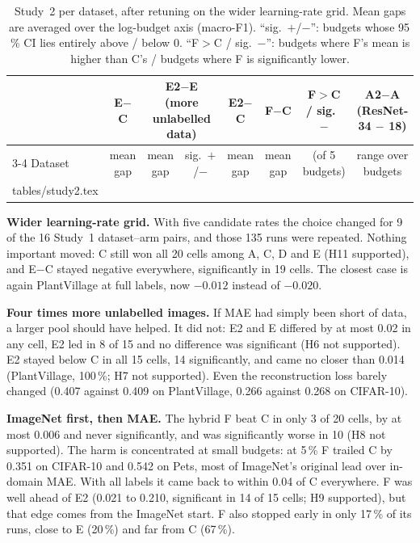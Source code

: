 \documentclass[conference]{IEEEtran}
\makeatletter
\newcommand{\tabinput}[1]{\@@input #1 }
\makeatother
\begin{document}
\begin{table}[t]
\centering
\caption{Study~2 per dataset, after retuning on the wider learning-rate grid. Mean gaps are averaged over the
log-budget axis (macro-F1). ``sig.\ $+$/$-$'': budgets whose 95\,\% CI lies entirely above / below 0. ``F$>$C /
sig.\ $-$'': budgets where F's mean is higher than C's / budgets where F is significantly lower.}
\label{tab:study2}
\footnotesize
\begin{tabular}{@{}lccccccc@{}}
\toprule
 & E$-$C & \multicolumn{2}{c}{E2$-$E (more unlabelled data)} & E2$-$C & F$-$C & F$>$C / sig.\ $-$ &
A2$-$A (ResNet-34 $-$ 18) \\
\cmidrule(lr){3-4}
Dataset & mean gap & mean gap & sig.\ $+$/$-$ & mean gap & mean gap & (of 5 budgets) & range over budgets \\
\midrule
\tabinput{tables/study2.tex}
\bottomrule
\end{tabular}
\end{table}

\textbf{Wider learning-rate grid.} With five candidate rates the choice changed for 9 of the 16 Study~1
dataset--arm pairs, and those 135 runs were repeated. Nothing important moved: C still won all 20 cells among
A, C, D and E (H11 supported), and E$-$C stayed negative everywhere, significantly in 19 cells. The closest case is
again PlantVillage at full labels, now $-0.012$ instead of $-0.020$.

\textbf{Four times more unlabelled images.} If MAE had simply been short of data, a larger pool should have helped.
It did not: E2 and E differed by at most 0.02 in any cell, E2 led in 8 of 15 and no difference was significant
(H6 not supported). E2 stayed below C in all 15 cells, 14 significantly, and came no closer than 0.014
(PlantVillage, 100\,\%; H7 not supported). Even the reconstruction loss barely changed (0.407 against 0.409 on
PlantVillage, 0.266 against 0.268 on CIFAR-10).

\textbf{ImageNet first, then MAE.} The hybrid F beat C in only 3 of 20 cells, by at most 0.006 and never
significantly, and was significantly worse in 10 (H8 not supported). The harm is concentrated at small budgets: at
5\,\% F trailed C by 0.351 on CIFAR-10 and 0.542 on Pets, most of ImageNet's original lead over in-domain MAE. With
all labels it came back to within 0.04 of C everywhere. F was well ahead of E2 (0.021 to 0.210, significant in 14
of 15 cells; H9 supported), but that edge comes from the ImageNet start. F also stopped early in only 17\,\% of its
runs, close to E (20\,\%) and far from C (67\,\%).
\end{document}
